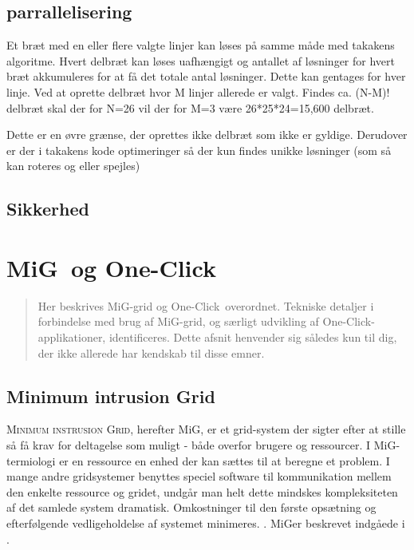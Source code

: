 \documentclass[draft,a4paper,10pt]{article}
\newcommand{\mig}{MiG}
\newcommand{\oc}{One-Click}
\begin{document}
\subsection{parrallelisering}

Et bræt med en eller flere valgte linjer kan løses på samme måde med takakens algoritme. Hvert delbræt kan løses uafhængigt og antallet af løsninger for hvert bræt akkumuleres for at få det totale antal løsninger.
Dette kan gentages for hver linje. Ved at oprette delbræt hvor M linjer allerede er valgt. Findes ca. (N-M)! delbræt skal der for N=26 vil der for M=3 være 26*25*24=15,600 delbræt.

Dette er en øvre grænse, der oprettes ikke delbræt som ikke er gyldige. Derudover er der i takakens kode optimeringer så der kun findes unikke løsninger (som så kan roteres og eller spejles) 


\subsection{Sikkerhed}

\section{\mig\ og \oc}\label{migogoneclick}
\begin{verse}
	Her beskrives \mig-grid og \oc\ overordnet. Tekniske detaljer i forbindelse med brug af \mig-grid, og særligt udvikling af \oc-applikationer, identificeres. Dette afsnit henvender sig således kun til dig, der ikke allerede har kendskab til disse emner.  
\end{verse}

\subsection{Minimum intrusion Grid}\label{mig}

\textsc{Minimum instrusion Grid}, herefter \mig, er et grid-system der sigter efter at stille så få krav for deltagelse som muligt - både overfor brugere og ressourcer. I \mig-termiologi er en ressource en enhed der kan sættes til at beregne et problem. I mange andre gridsystemer benyttes speciel software til kommunikation mellem den enkelte ressource og gridet, undgår man helt dette mindskes kompleksiteten af det samlede system dramatisk. Omkostninger til den første opsætning og efterfølgende vedligeholdelse af systemet minimeres. . \mig er beskrevet indgåede i \cite{simplemig,mig}.
\end{document}
